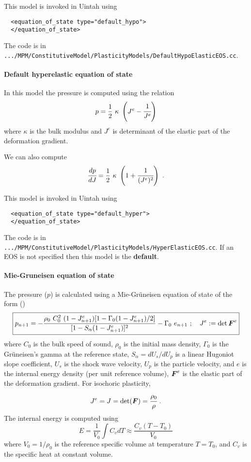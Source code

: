 This model is invoked in Uintah using
\begin{verbatim}
  <equation_of_state type="default_hypo">
  </equation_of_state>
\end{verbatim}
The code is in \verb|.../MPM/ConstitutiveModel/PlasticityModels/DefaultHypoElasticEOS.cc|.

\paragraph{Default hyperelastic equation of state}
In this model the pressure is computed using the relation
\begin{equation}
  p = \Half~\kappa~\left(J^e - \cfrac{1}{J^e}\right)
\end{equation}
where $\kappa$ is the bulk modulus and $J^e$ is determinant of the elastic 
part of the deformation gradient.

We can also compute
\begin{equation}
  \Deriv{p}{J} = \Half~\kappa~\left(1 + \cfrac{1}{(J^e)^2}\right) ~.
\end{equation}

This model is invoked in Uintah using
\begin{verbatim}
  <equation_of_state type="default_hyper">
  </equation_of_state>
\end{verbatim}
The code is in \verb|.../MPM/ConstitutiveModel/PlasticityModels/HyperElasticEOS.cc|.  If an EOS is not specified then this model is the {\bf default}.

\paragraph{Mie-Gruneisen equation of state}
The pressure ($p$) is calculated using a Mie-Gr{\"u}neisen equation of state 
of the form (\cite{Wilkins99,Zocher00})
\begin{equation} \label{eq:EOSMG_upd}
  \boxed{
  p_{n+1} =  - \frac{\rho_0~C_0^2~(1 - J^e_{n+1})
           [1 - \Gamma_0 (1 - J^e_{n+1})/2]}
           {[1 - S_{\alpha}(1 - J^e_{n+1})]^2} - \Gamma_0~e_{n+1} 
  ~;~~~ J^e := \det{\BF^e} 
  }
\end{equation}
where $C_0$ is the bulk speed of sound, $\rho_0$ is the initial mass density,
$\Gamma_0$ is the Gr{\"u}neisen's gamma at the reference state,
$S_{\alpha} = dU_s/dU_p$ is a linear Hugoniot slope coefficient,
$U_s$ is the shock wave velocity, $U_p$ is the particle velocity, and
$e$ is the internal energy density (per unit reference volume), $\BF^e$ is
the elastic part of the deformation gradient.  For isochoric plasticity,
\begin{equation*}
  J^e = J = \det(\BF) = \cfrac{\rho_0}{\rho} ~.
\end{equation*}
  The internal energy is computed using
  \begin{equation}
    E = \frac{1}{V_0} \int C_v dT \approx \frac{C_v (T-T_0)}{V_0}
  \end{equation}
  where $V_0 = 1/\rho_0$ is the reference specific volume at temperature 
  $T = T_0$, and $C_v$ is the specific heat at constant volume.

